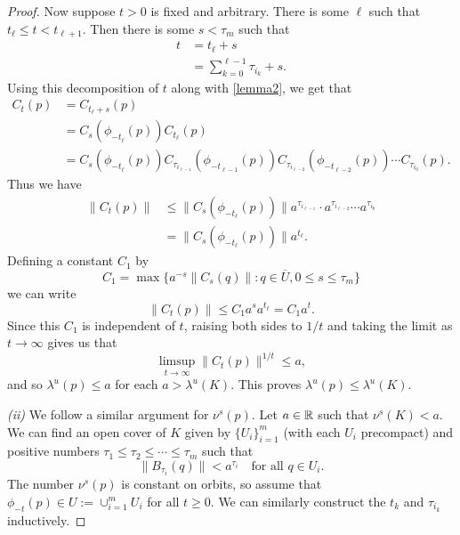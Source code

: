 \begin{proof}
	Now suppose \(t>0\) is fixed and arbitrary. There is some \(\ell\) such that \(t_\ell \leq t < t_{\ell+1}\). Then there is some \(s < \tau_m\) such that 
	\begin{equation*}
		\begin{aligned}
			t &= t_\ell + s \\
			&= \sum_{k=0}^{\ell - 1} \tau_{i_k} +s .
		\end{aligned}
	\end{equation*}
	Using this decomposition of \(t\) along with \cref{lemma2}, we get that
	\begin{equation*}
		\begin{aligned}
			C_t(p) &= C_{t_\ell+s}(p) \\
			&= C_s( \phi_{-t_\ell}(p) ) C_{t_\ell} (p) \\
			&= C_s( \phi_{-t_\ell}(p) ) C_{\tau_{i_{\ell-1}}}(\phi_{-t_{\ell-1}}(p)) C_{\tau_{i_{\ell-2}}}(\phi_{-t_{\ell-2}}(p)) \cdots C_{\tau_{i_0}}(p).
		\end{aligned}
	\end{equation*}
	Thus we have
	\begin{equation*}
		\begin{aligned}
			\| C_t(p) \| &\leq \| C_s(\phi_{-t_\ell}(p)) \| a^{\tau_{i_{\ell -1}}} \cdot a^{\tau_{i_{\ell-2}}} \cdots a^{\tau_{i_0}} \\
			&= \| C_s(\phi_{-t_\ell}(p)) \| a^{t_\ell}.
		\end{aligned}
	\end{equation*}
	Defining a constant \(C_1\) by 
	\begin{equation*}
		C_1 = \max\{ a^{-s} \| C_s(q) \| : q\in \overline U , 0 \leq s \leq \tau_m\}
	\end{equation*}
	we can write
	\begin{equation*}
		\|C_t(p) \| \leq C_1 a^s a^{t_\ell} = C_1 a^t.
	\end{equation*}
	Since this \(C_1\) is independent of \(t\), raising both sides to \(1/t\) and taking the limit as \(t\to\infty\) gives us that 
	\begin{equation*}
		\limsup_{t \to \infty} \| C_t(p) \| ^{1/t} \leq a,
	\end{equation*}
	and so \(\lambda^u(p) \leq a\) for each \(a > \lambda^u(K).\) This proves \(\lambda^u(p) \leq \lambda^u(K)\).
	
	\emph{(ii)} We follow a similar argument for \(\nu^s(p)\). Let \(a\in \mathbb{R}\) such that \(\nu^s(K) < a\). We can find an open cover of \(K\) given by \(\{U_i\}_{i=1}^m\) (with each \(U_i\) precompact) and positive numbers \(\tau_1 \leq \tau_2\leq \cdots \leq \tau_m\) such that
	\begin{equation*}
		\| B_{\tau_i}(q) \| < a^{\tau_i} \quad \text{for all } q\in U_i.
	\end{equation*}
	The number \(\nu^s(p)\) is constant on orbits, so assume that \(\phi_{-t}(p) \in U := \cup_{i=1}^m U_i \) for all \(t\geq 0\). We can similarly construct the \(t_k\) and \(\tau_{i_k}\) inductively.
	

\end{proof}
